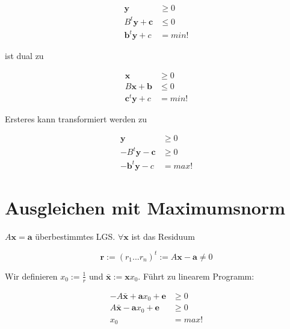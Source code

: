 \documentclass[8pt, DIV15, twocolumn]{scrartcl}
\begin{document}
\begin{equation*}
\begin{aligned}
\mathbf{y} &\geq 0 \\
B^t \mathbf{y} + \mathbf{c} &\leq 0 \\
\mathbf{b}^t \mathbf{y} + c &= min!
\end{aligned}
\end{equation*}

ist dual zu

\begin{equation*}
\begin{aligned}
\mathbf{x} &\geq 0 \\
B \mathbf{x} + \mathbf{b} &\leq 0 \\
\mathbf{c}^t \mathbf{y} + c &= min!
\end{aligned}
\end{equation*}

Ersteres kann transformiert werden zu

\begin{equation*}
\begin{aligned}
\mathbf{y} &\geq 0 \\
-B^t \mathbf{y} - \mathbf{c} &\geq 0 \\
-\mathbf{b}^t \mathbf{y} - c &= max!
\end{aligned}
\end{equation*}

\section*{Ausgleichen mit Maximumsnorm}
$A\mathbf{x} = \mathbf{a}$ überbestimmtes LGS. $\forall \mathbf{x}$ ist das Residuum

\begin{equation*}
\mathbf{r} := \left(r_1 ... r_n \right)^t := A \mathbf{x} - \mathbf{a} \neq 0
\end{equation*}

Wir definieren $x_0 := \frac{1}{r}$ und $\bar{\mathbf{x}} := \mathbf{x} x_0$. Führt zu linearem Programm:

\begin{equation*}
\begin{aligned}
-A\bar{\mathbf{x}} + \mathbf{a} x_0 + \mathbf{e} &\geq 0 \\
A\bar{\mathbf{x}} - \mathbf{a} x_0 + \mathbf{e} &\geq 0 \\
x_0 &= max!
\end{aligned}
\end{equation*}
\end{document}
